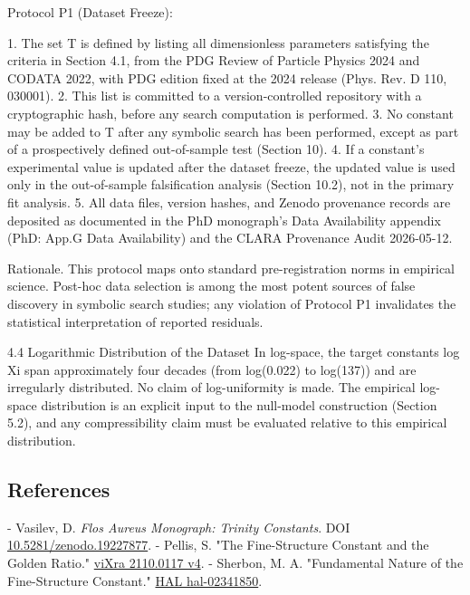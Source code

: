   Protocol P1 (Dataset Freeze):

  1. The set T is defined by listing all dimensionless parameters satisfying the criteria in
  Section 4.1, from the PDG Review of Particle Physics 2024 and CODATA 2022, with
  PDG edition fixed at the 2024 release (Phys. Rev. D 110, 030001).
  2. This list is committed to a version-controlled repository with a cryptographic hash,
  before any search computation is performed.
  3. No constant may be added to T after any symbolic search has been performed,
  except as part of a prospectively defined out-of-sample test (Section 10).
  4. If a constant's experimental value is updated after the dataset freeze, the updated
  value is used only in the out-of-sample falsification analysis (Section 10.2), not in the
  primary fit analysis.
  5. All data files, version hashes, and Zenodo provenance records are deposited as
  documented in the PhD monograph's Data Availability appendix (PhD: App.G Data
  Availability) and the CLARA Provenance Audit 2026-05-12.

  Rationale. This protocol maps onto standard pre-registration norms in empirical
  science. Post-hoc data selection is among the most potent sources of false discovery in
  symbolic search studies; any violation of Protocol P1 invalidates the statistical
  interpretation of reported residuals.

  4.4 Logarithmic Distribution of the Dataset
  In log-space, the target constants {log Xi} span approximately four decades (from
  log(0.022) to log(137)) and are irregularly distributed. No claim of log-uniformity is
  made. The empirical log-space distribution is an explicit input to the null-model
  construction (Section 5.2), and any compressibility claim must be evaluated relative to
  this empirical distribution.

\subsection{References}

- Vasilev, D. \textit{Flos Aureus Monograph: Trinity Constants}. DOI \href{https://zenodo.org/doi/10.5281/zenodo.19227877}{10.5281/zenodo.19227877}.
- Pellis, S. "The Fine-Structure Constant and the Golden Ratio." \href{https://vixra.org/pdf/2110.0117v4.pdf}{viXra 2110.0117 v4}.
- Sherbon, M. A. "Fundamental Nature of the Fine-Structure Constant." \href{https://hal.science/hal-02341850/document}{HAL hal-02341850}.
